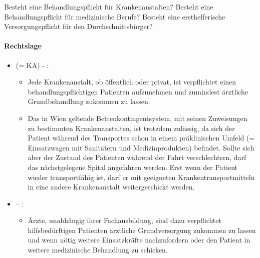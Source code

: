 Besteht eine Behandlungspflicht f\"ur Krankenanstalten? Besteht eine
Behandlungspflicht f\"ur medizinische Berufe? Besteht eine
ersthelferische Versorgungspflicht f\"ur den Durchschnittsb\"urger?

\paragraph*{Rechtslage}

\begin{itemize}
\item {\mdseries
	 (=
	KA) - :}


	\begin{itemize}
	
		\item {\mdseries
		Jede Krankenanstalt, ob \"offentlich oder privat, ist verpflichtet einen
		behandlungspflichtigen Patienten  aufzunehmen und
		zumindest ärztliche Grundbehandlung zukommen zu lassen. }

		\item {\mdseries
		Das in Wien geltende Bettenkontingentsystem, mit seinen Zuweisungen zu
		bestimmten Krankenanstalten, ist trotzdem zulässig, da
		sich der Patient während des Transportes schon in einem präklinischen Umfeld (=
		Einsatzwagen mit Sanitätern und Medizinprodukten) befindet. Sollte
		sich aber der Zustand des Patienten während der Fahrt
		verschlechtern, darf das nächstgelegene Spital angefahren werden. \newline
		Erst wenn der Patient wieder transportfähig ist, darf er mit geeigneten
		Krankentransportmitteln in eine andere Krankenanstalt weitergeschickt werden.}

	\end{itemize}

	\item {\mdseries
	 --	:}

	\begin{itemize}
	
		\item {\mdseries
		\"Arzte, unabhängig ihrer Fachausbildung, sind dazu verpflichtet
		hilfsbed\"urftigen Patienten ärztliche Grundversorgung
		zukommen zu lassen und wenn n\"otig weitere Einsatzkräfte nachzufordern oder den Patient in
		weitere medizinische Behandlung zu schicken.}

	\end{itemize}


\end{itemize}
